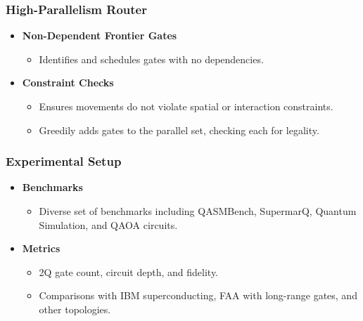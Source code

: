 \documentclass[18 pt]{beamer}
\begin{document}
\begin{frame}
    \frametitle{High-Parallelism Router}
    \begin{itemize}
        \item \textbf{Non-Dependent Frontier Gates}
        \begin{itemize}
            \item Identifies and schedules gates with no dependencies.
        \end{itemize}
        \item \textbf{Constraint Checks}
        \begin{itemize}
            \item Ensures movements do not violate spatial or interaction constraints.
            \item Greedily adds gates to the parallel set, checking each for legality.
        \end{itemize}
    \end{itemize}
\end{frame}

\begin{frame}
    \frametitle{Experimental Setup}
    \begin{itemize}
        \item \textbf{Benchmarks}
        \begin{itemize}
            \item Diverse set of benchmarks including QASMBench, SupermarQ, Quantum Simulation, and QAOA circuits.
        \end{itemize}
        \item \textbf{Metrics}
        \begin{itemize}
            \item 2Q gate count, circuit depth, and fidelity.
            \item Comparisons with IBM superconducting, FAA with long-range gates, and other topologies.
        \end{itemize}
    \end{itemize}
\end{frame}
\end{document}
